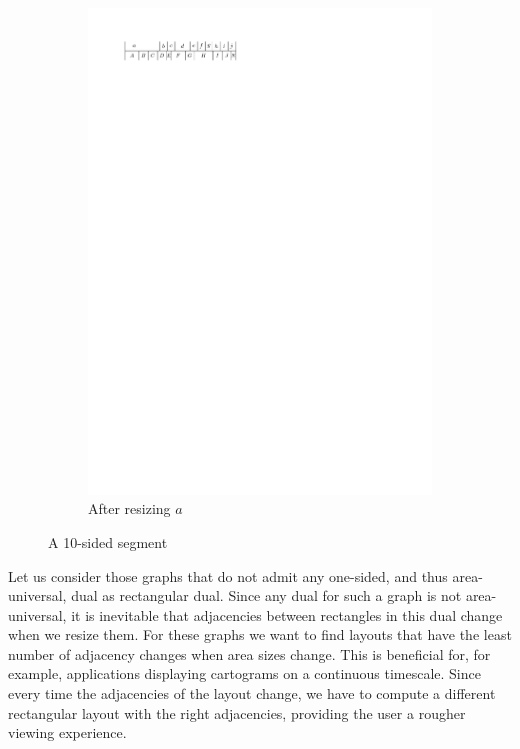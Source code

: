 \begin{figure}[t]
\begin{subfigure}[b]{0.45 \textwidth}
      \includegraphics[width=\textwidth]{introduction/img/10sidedAfter.pdf}
      \caption{After resizing $a$}
      \label{fig:intro:10sidedAfter}
    \end{subfigure}
    \quad
    \caption{A 10-sided segment}
    \label{fig:intro:10sided}
  \end{figure}
  Let us consider those graphs that do not admit any one-sided, and thus area-universal, dual as rectangular dual.
  Since any dual for such a graph is not area-universal, it is inevitable that adjacencies between rectangles in this dual change when we resize them.
  For these graphs we want to find layouts that have the least number of adjacency changes when area sizes change.
  This is beneficial for, for example, applications displaying cartograms on a continuous timescale.
  Since every time the adjacencies of the layout change, we have to compute a different rectangular layout with the right adjacencies, providing the user a rougher viewing experience.

